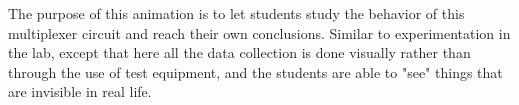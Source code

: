 





The purpose of this animation is to let students study the behavior of this multiplexer circuit and reach their own conclusions.  Similar to experimentation in the lab, except that here all the data collection is done visually rather than through the use of test equipment, and the students are able to "see" things that are invisible in real life.




